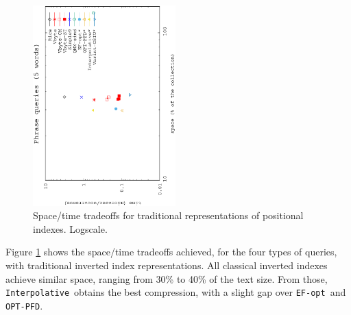 \documentclass[review]{elsarticle}
\newcommand{\vbyte}{\texttt{Vbyte}}
\newcommand{\rice}{\texttt{Rice}}
\newcommand{\simplen}{\texttt{Simple9}}
\newcommand{\qmx}{\texttt{QMX}}
\newcommand{\vbyteST}{\texttt{Vbyte-ST}}
\newcommand{\interpolative}{\texttt{Interpolative}}
\newcommand{\efopt}{\texttt{EF-opt}}
\newcommand{\optpfd}{\texttt{OPT-PFD}}
\newcommand{\varint}{\texttt{varintG8IU}}
\begin{document}
\begin{figure}[t]
\begin{center}
\includegraphics[angle=-90,width=0.49\textwidth]{../figures/f3/phrases5-5/locate-5_5.eps}
\caption{Space/time tradeoffs for traditional representations of positional indexes. Logscale.}
\label{fig:pos}
\end{center}
\end{figure}

Figure \ref{fig:pos} shows the space/time tradeoffs achieved, for the four
types of queries, with traditional inverted index representations.
All classical inverted indexes achieve similar space, ranging from 30\% to 40\% of the text size. From those, \interpolative\ obtains the best compression, with a slight gap over \efopt\ and \optpfd. 

% 
% 
\end{document}
